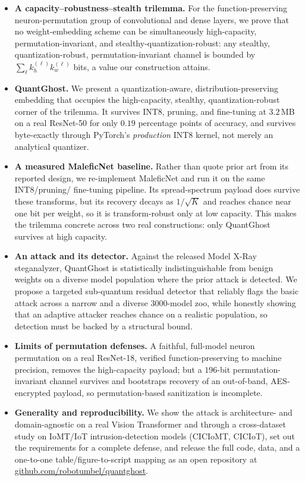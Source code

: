 \documentclass[11pt]{article}
\begin{document}
\begin{itemize}
\item \textbf{A capacity--robustness--stealth trilemma.} For the function-preserving
  neuron-permutation group of convolutional and dense layers, we prove that no
  weight-embedding scheme can be simultaneously high-capacity, permutation-invariant, and
  stealthy-quantization-robust: any stealthy, quantization-robust, permutation-invariant
  channel is bounded by $\sum_\ell k_h^{(\ell)} k_w^{(\ell)}$ bits, a value our
  construction attains.
\item \textbf{QuantGhost.} We present a quantization-aware, distribution-preserving
  embedding that occupies the high-capacity, stealthy, quantization-robust corner of the
  trilemma. It survives INT8, pruning, and fine-tuning at $3.2$\,MB on a real ResNet-50
  for only $0.19$ percentage points of accuracy, and survives byte-exactly through
  PyTorch's \emph{production} INT8 kernel, not merely an analytical quantizer.
\item \textbf{A measured MaleficNet baseline.} Rather than quote prior art from its
  reported design, we re-implement MaleficNet and run it on the same INT8/pruning/
  fine-tuning pipeline. Its spread-spectrum payload does survive these transforms, but its
  recovery decays as $1/\sqrt{K}$ and reaches chance near one bit per weight, so it is
  transform-robust only at low capacity. This makes the trilemma concrete across two real
  constructions: only QuantGhost survives at high capacity.
\item \textbf{An attack and its detector.} Against the released Model X-Ray steganalyzer,
  QuantGhost is statistically indistinguishable from benign weights on a diverse model
  population where the prior attack is detected. We propose a targeted sub-quantum residual
  detector that reliably flags the basic attack across a narrow and a diverse
  $3000$-model zoo, while honestly showing that an adaptive attacker reaches chance on a
  realistic population, so detection must be backed by a structural bound.
\item \textbf{Limits of permutation defenses.} A faithful, full-model neuron permutation
  on a real ResNet-18, verified function-preserving to machine precision, removes the
  high-capacity payload; but a $196$-bit permutation-invariant channel survives and
  bootstraps recovery of an out-of-band, AES-encrypted payload, so permutation-based
  sanitization is incomplete.
\item \textbf{Generality and reproducibility.} We show the attack is architecture- and
  domain-agnostic on a real Vision Transformer and through a cross-dataset study on
  IoMT/IoT intrusion-detection models (CICIoMT, CICIoT), set out the requirements for a
  complete defense, and release the full code, data, and a one-to-one
  table/figure-to-script mapping as an open repository at
  \href{https://github.com/robotumbel/quantghost}{github.com/robotumbel/quantghost}.
\end{itemize}
\end{document}
